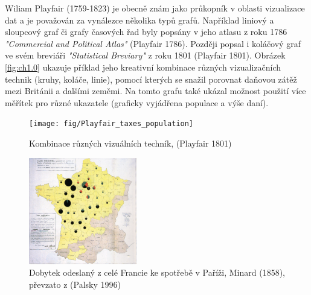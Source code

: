 \documentclass[12pt,]{article}
\begin{document}
\qquad Wiliam Playfair (1759-1823) je obecně znám jako průkopník v
oblasti vizualizace dat a je považován za vynálezce několika typů grafů.
Například liniový a sloupcový graf či grafy časových řad byly popsány v
jeho atlasu z roku 1786 \textit{"Commercial and Political Atlas"}
(Playfair 1786). Později popsal i koláčový graf ve svém breviáři
\textit{"Statistical Breviary"} z roku 1801 (Playfair 1801). Obrázek
\ref{fig:ch1.0} ukazuje příklad jeho kreativní kombinace různých
vizualizačních technik (kruhy, koláče, linie), pomocí kterých se snažil
porovnat daňovou zátěž mezi Británii a dalšími zeměmi. Na tomto grafu
také ukázal možnost použití více měřítek pro různé ukazatele (graficky
vyjádřena populace a výše daní).

\begin{figure}[H]

{\centering \texttt{[image: fig/Playfair\_taxes\_population]} 

}

\caption{\label{fig:ch1.0} Kombinace různých vizuálních techník, (Playfair 1801)}\label{fig:playfair}
\end{figure}

\newpage

\begin{figure}
    \centering
    \includegraphics[width=0.42\textwidth]{fig/Minard_1858}
    \vspace{-5pt}
    \caption{Dobytek odeslaný z celé Francie ke spotřebě v Paříži, Minard (1858), převzato z (Palsky 1996)}
    \label{fig:ch1.1}
\end{figure}
\end{document}
